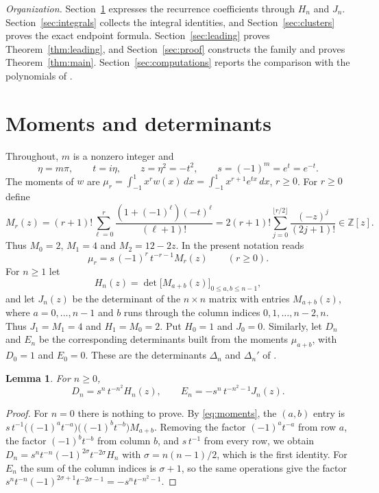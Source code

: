 \documentclass[11pt]{amsart}
\newtheorem{lemma}[theorem]{Lemma}
\theoremstyle{remark}
\numberwithin{equation}{section}
\newcommand{\Z}{\mathbb{Z}}
\begin{document}
\emph{Organization.} Section~\ref{sec:determinants} expresses the recurrence coefficients through $H_n$ and $J_n$. Section~\ref{sec:integrals} collects the integral identities, and Section~\ref{sec:clusters} proves the exact endpoint formula. Section~\ref{sec:leading} proves Theorem~\ref{thm:leading}, and Section~\ref{sec:proof} constructs the family and proves Theorem~\ref{thm:main}. Section~\ref{sec:computations} reports the comparison with the polynomials of \cite{LZ}.

\section{Moments and determinants}\label{sec:determinants}

Throughout, $m$ is a nonzero integer and
\[
\eta=m\pi,\qquad t=i\eta,\qquad z=\eta^2=-t^2,\qquad s=(-1)^m=e^{t}=e^{-t}.
\]
The moments of $w$ are $\mu_r=\int_{-1}^{1}x^rw(x)\,dx=\int_{-1}^{1}x^{r+1}e^{tx}\,dx$, $r\ge0$. For $r\ge0$ define
\[
M_r(z)=(r+1)!\sum_{\ell=0}^{r}\frac{(1+(-1)^\ell)(-t)^\ell}{(\ell+1)!}
=2(r+1)!\sum_{j=0}^{\lfloor r/2\rfloor}\frac{(-z)^j}{(2j+1)!}\in\Z[z].
\]
Thus $M_0=2$, $M_1=4$ and $M_2=12-2z$. In the present notation \cite[(2.5)]{MC} reads
\begin{equation}\label{eq:moments}
\mu_r=s\,(-1)^r\,t^{-r-1}M_r(z)\qquad(r\ge0).
\end{equation}
For $n\ge1$ let
\[
H_n(z)=\det\bigl[M_{a+b}(z)\bigr]_{0\le a,b\le n-1},
\]
and let $J_n(z)$ be the determinant of the $n\times n$ matrix with entries $M_{a+b}(z)$, where $a=0,\dots,n-1$ and $b$ runs through the column indices $0,1,\dots,n-2,n$. Thus $J_1=M_1=4$ and $H_1=M_0=2$. Put $H_0=1$ and $J_0=0$. Similarly, let $D_n$ and $E_n$ be the corresponding determinants built from the moments $\mu_{a+b}$, with $D_0=1$ and $E_0=0$. These are the determinants $\Delta_n$ and $\Delta_n'$ of \cite{MC}.

\begin{lemma}\label{lem:normalization}
For $n\ge0$,
\[
D_n=s^n\,t^{-n^2}H_n(z),\qquad E_n=-s^n\,t^{-n^2-1}J_n(z).
\]
\end{lemma}

\begin{proof}
For $n=0$ there is nothing to prove. By \eqref{eq:moments}, the $(a,b)$ entry is $s\,t^{-1}\bigl((-1)^at^{-a}\bigr)\bigl((-1)^bt^{-b}\bigr)M_{a+b}$. Removing the factor $(-1)^at^{-a}$ from row $a$, the factor $(-1)^bt^{-b}$ from column $b$, and $s\,t^{-1}$ from every row, we obtain $D_n=s^nt^{-n}(-1)^{2\sigma}t^{-2\sigma}H_n$ with $\sigma=n(n-1)/2$, which is the first identity. For $E_n$ the sum of the column indices is $\sigma+1$, so the same operations give the factor $s^nt^{-n}(-1)^{2\sigma+1}t^{-2\sigma-1}=-s^nt^{-n^2-1}$.
\end{proof}
\end{document}
